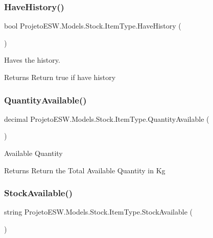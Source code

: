 \subsubsection{\texorpdfstring{Have\+History()}{HaveHistory()}}
{\footnotesize\ttfamily bool Projeto\+E\+S\+W.\+Models.\+Stock.\+Item\+Type.\+Have\+History (\begin{DoxyParamCaption}{ }\end{DoxyParamCaption})}



Haves the history.

\begin{DoxyReturn}{Returns}
Return true if have history
\end{DoxyReturn}
\mbox{\label{class_projeto_e_s_w_1_1_models_1_1_stock_1_1_item_type_a5046421fbe274e5364cc71537ad9ca48}} 
\subsubsection{\texorpdfstring{Quantity\+Available()}{QuantityAvailable()}}
{\footnotesize\ttfamily decimal Projeto\+E\+S\+W.\+Models.\+Stock.\+Item\+Type.\+Quantity\+Available (\begin{DoxyParamCaption}{ }\end{DoxyParamCaption})}



Available Quantity

\begin{DoxyReturn}{Returns}
Return the Total Available Quantity in Kg
\end{DoxyReturn}
\mbox{\label{class_projeto_e_s_w_1_1_models_1_1_stock_1_1_item_type_a60a0facfc74bd8e9f06fdb1fceaf95ee}} 
\subsubsection{\texorpdfstring{Stock\+Available()}{StockAvailable()}}
{\footnotesize\ttfamily string Projeto\+E\+S\+W.\+Models.\+Stock.\+Item\+Type.\+Stock\+Available (\begin{DoxyParamCaption}{ }\end{DoxyParamCaption})}



